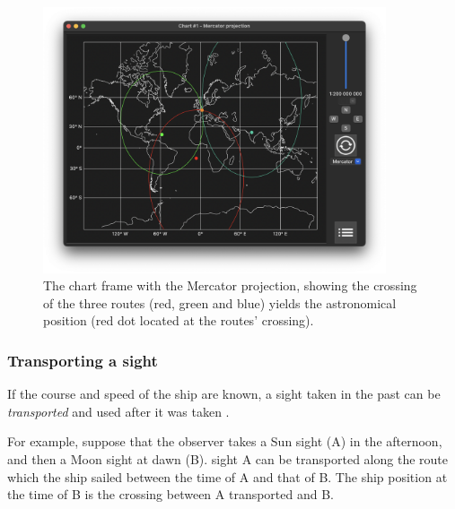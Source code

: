 \documentclass{ol-softwaremanual}
\begin{document}
\begin{figure}
  \centering
  \includegraphics[width=0.9\textwidth]{figures/astronomical-position-mercator.png}
  \caption{
    \label{fig-astronomical-position}
    The chart frame with the Mercator projection, showing the crossing of the three routes (red, green and blue) yields the astronomical position (red dot located at the routes' crossing).  
  }
\end{figure}


\subsubsection{Transporting a sight}\label{section-transporting-sight}

If the course and speed of the ship are known, a \gls{sight} taken in the past can be \textit{transported} and used after it was taken \cite{bowditch2002the,noauthor2017cours}. 

For example, suppose that the observer takes a Sun \gls{sight} (A) in the afternoon, and then a Moon \gls{sight} at dawn (B). \Gls{sight} A can be transported along the route which the ship sailed between the time of A and that of B. The ship position at the time of B is the crossing between A transported and B. 
\end{document}
